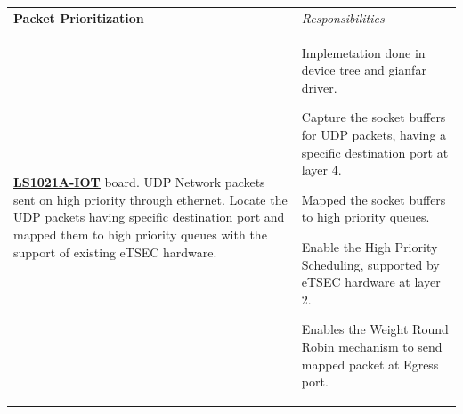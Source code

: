 \endgroup
%
%
\vspace{-2pt}
%
\begingroup
\setlength{\tabcolsep}{5pt} %
\indent\begin{tabularx}{\textwidth}{p{} p{\RIGHTCOLUMNWIDTH}} %
    \textbf{Packet Prioritization} & \emph{Responsibilities} \\%
        \href{http://www.nxp.com/products/reference-designs/qoriq-ls1021a-iot-gateway-reference-design:LS1021A-IoT}{\textbf{\underline{LS1021A-IOT}}}
          board. UDP Network packets sent on high priority through ethernet. Locate the UDP packets having specific destination port and mapped them to high priority queues with the support of existing eTSEC hardware.
         &
        \vspace{-\topsep}\vspace{2pt} \begin{myitemize}
    \footnotesize {
             \item Implemetation done in device tree and gianfar driver.
             \item Capture the socket buffers for UDP packets, having a specific destination port at layer 4.
             \item Mapped the socket buffers to high priority queues.
             \item Enable the High Priority Scheduling, supported by eTSEC hardware at layer 2.
             \item Enables the Weight Round Robin mechanism to send mapped packet at Egress port.
    }
   \end{myitemize}\vspace{-\topsep}%
\end{tabularx}
